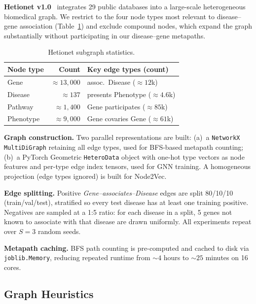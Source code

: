 \documentclass[10pt,a4paper,twocolumn]{article}
\begin{document}
\textbf{Hetionet v1.0}~\citep{himmelstein2017} integrates 29 public databases
into a large-scale heterogeneous biomedical graph. We restrict to the four node
types most relevant to disease--gene association (Table~\ref{tab:data}) and
exclude compound nodes, which expand the graph substantially without
participating in our disease--gene metapaths.

\begin{table}[H]
\centering\scriptsize
\caption{Hetionet subgraph statistics.}
\label{tab:data}
\setlength{\tabcolsep}{3pt}
\begin{tabular}{lrp{2.4cm}}
\toprule
\textbf{Node type} & \textbf{Count} & \textbf{Key edge types (count)} \\
\midrule
Gene      & ${\approx}13{,}000$ & assoc.\ Disease (${\approx}12$k) \\
Disease   & ${\approx}137$      & presents Phenotype (${\approx}4.6$k) \\
Pathway   & ${\approx}1{,}400$  & Gene participates (${\approx}85$k) \\
Phenotype & ${\approx}9{,}000$  & Gene covaries Gene (${\approx}61$k) \\
\bottomrule
\end{tabular}
\end{table}

\textbf{Graph construction.} Two parallel representations are built: (a)~a
\texttt{NetworkX MultiDiGraph} retaining all edge types, used for BFS-based
metapath counting; (b)~a PyTorch Geometric \texttt{HeteroData} object with
one-hot type vectors as node features and per-type edge index tensors, used for
GNN training. A homogeneous projection (edge types ignored) is built for
Node2Vec.

\textbf{Edge splitting.} Positive \textit{Gene--associates--Disease} edges are
split 80/10/10 (train/val/test), stratified so every test disease has at least
one training positive. Negatives are sampled at a 1:5 ratio: for each disease in
a split, 5 genes not known to associate with that disease are drawn uniformly.
All experiments repeat over $S=3$ random seeds.

\textbf{Metapath caching.} BFS path counting is pre-computed and cached to disk
via \texttt{joblib.Memory}, reducing repeated runtime from ${\sim}4$ hours to
${\sim}25$ minutes on 16 cores.

\subsection{Graph Heuristics}
\end{document}
